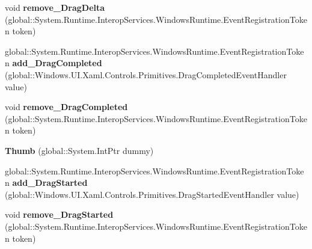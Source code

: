\begin{DoxyCompactItemize}
\item 
\mbox{\label{class_windows_1_1_u_i_1_1_xaml_1_1_controls_1_1_primitives_1_1_thumb_aafa7ff7377726fee9d57013616690ae3}} 
void {\bfseries remove\+\_\+\+Drag\+Delta} (global\+::\+System.\+Runtime.\+Interop\+Services.\+Windows\+Runtime.\+Event\+Registration\+Token token)
\item 
\mbox{\label{class_windows_1_1_u_i_1_1_xaml_1_1_controls_1_1_primitives_1_1_thumb_a78452356d0361197920635b5002bf90f}} 
global\+::\+System.\+Runtime.\+Interop\+Services.\+Windows\+Runtime.\+Event\+Registration\+Token {\bfseries add\+\_\+\+Drag\+Completed} (global\+::\+Windows.\+U\+I.\+Xaml.\+Controls.\+Primitives.\+Drag\+Completed\+Event\+Handler value)
\item 
\mbox{\label{class_windows_1_1_u_i_1_1_xaml_1_1_controls_1_1_primitives_1_1_thumb_a097aeafd8ad0e07599e35793e0ef16ca}} 
void {\bfseries remove\+\_\+\+Drag\+Completed} (global\+::\+System.\+Runtime.\+Interop\+Services.\+Windows\+Runtime.\+Event\+Registration\+Token token)
\item 
\mbox{\label{class_windows_1_1_u_i_1_1_xaml_1_1_controls_1_1_primitives_1_1_thumb_acd7bc9b9e039aaac5e1b684e7f15f078}} 
{\bfseries Thumb} (global\+::\+System.\+Int\+Ptr dummy)
\item 
\mbox{\label{class_windows_1_1_u_i_1_1_xaml_1_1_controls_1_1_primitives_1_1_thumb_ab1e477ea93baeef13137c92d8314a13a}} 
global\+::\+System.\+Runtime.\+Interop\+Services.\+Windows\+Runtime.\+Event\+Registration\+Token {\bfseries add\+\_\+\+Drag\+Started} (global\+::\+Windows.\+U\+I.\+Xaml.\+Controls.\+Primitives.\+Drag\+Started\+Event\+Handler value)
\item 
\mbox{\label{class_windows_1_1_u_i_1_1_xaml_1_1_controls_1_1_primitives_1_1_thumb_a44985b0beddf8dcf180137b37763091e}} 
void {\bfseries remove\+\_\+\+Drag\+Started} (global\+::\+System.\+Runtime.\+Interop\+Services.\+Windows\+Runtime.\+Event\+Registration\+Token token)

\end{DoxyCompactItemize}
